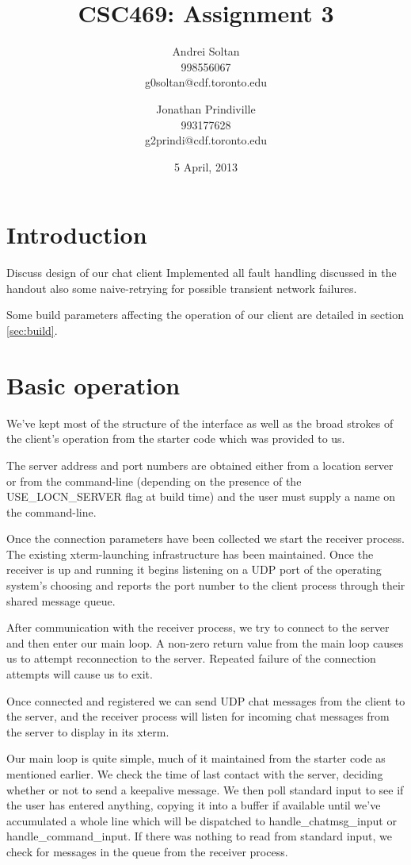 \documentclass{article}
\author{Andrei Soltan\\998556067\\g0soltan@cdf.toronto.edu
\and Jonathan Prindiville\\993177628\\g2prindi@cdf.toronto.edu}
\title{CSC469: Assignment 3}
\date{5 April, 2013}
\begin{document}
\maketitle

\tableofcontents

\newpage
\section{Introduction}
Discuss design of our chat client
Implemented all fault handling discussed in the handout also some
naive-retrying for possible transient network failures.

Some build parameters affecting the operation of our client are detailed
in section \ref{sec:build}.

\section{Basic operation}
We've kept most of the structure of the interface as well as the broad
strokes of the client's operation from the starter code which was
provided to us.

The server address and port numbers are obtained either from a location
server or from the command-line (depending on the presence of the
USE\_LOCN\_SERVER flag at build time) and the user must supply a name
on the command-line.

Once the connection parameters have been collected we start the
receiver process. The existing xterm-launching infrastructure has been
maintained. Once the receiver is up and running it begins listening
on a UDP port of the operating system's choosing and reports the port
number to the client process through their shared message queue.

After communication with the receiver process, we try to connect to the
server and then enter our main loop. A non-zero return value from the
main loop causes us to attempt reconnection to the server. Repeated 
failure of the connection attempts will cause us to exit.

Once connected and registered we can send UDP chat messages from the
client to the server, and the receiver process will listen for incoming
chat messages from the server to display in its xterm.

Our main loop is quite simple, much of it maintained from the starter code
as mentioned earlier. We check the time of last contact with the server,
deciding whether or not to send a keepalive message. We then
poll standard input to see if the user has entered anything, copying it into
a buffer if available until we've accumulated a whole line which will be
dispatched to handle\_chatmsg\_input or handle\_command\_input. If there 
was nothing to read from standard input, we check for messages in the
queue from the receiver process.
\end{document}
